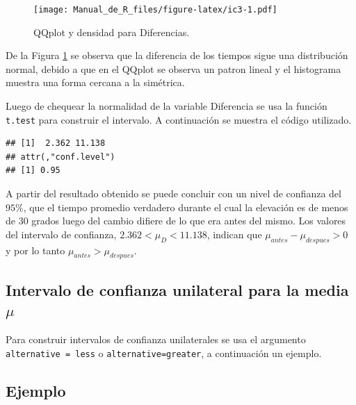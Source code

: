 \documentclass[10pt,]{krantz}
\makeatletter
\newenvironment{Shaded}{\begin{snugshade}}{\end{snugshade}}
\newcommand{\KeywordTok}[1]{\textcolor[rgb]{0.13,0.29,0.53}{\textbf{{#1}}}}
\newcommand{\DataTypeTok}[1]{\textcolor[rgb]{0.13,0.29,0.53}{{#1}}}
\newcommand{\FloatTok}[1]{\textcolor[rgb]{0.00,0.00,0.81}{{#1}}}
\newcommand{\OtherTok}[1]{\textcolor[rgb]{0.56,0.35,0.01}{{#1}}}
\newcommand{\NormalTok}[1]{{#1}}
\newenvironment{kframe}{%
\medskip{}
\setlength{\fboxsep}{.8em}
 \def\at@end@of@kframe{}%
 \ifinner\ifhmode%
  \def\at@end@of@kframe{\end{minipage}}%
  \begin{minipage}{\columnwidth}%
 \fi\fi%
 \def\FrameCommand##1{\hskip\@totalleftmargin \hskip-\fboxsep
 \colorbox{shadecolor}{##1}\hskip-\fboxsep
     \hskip-\linewidth \hskip-\@totalleftmargin \hskip\columnwidth}%
 \MakeFramed {\advance\hsize-\width
   \@totalleftmargin\z@ \linewidth\hsize
   \@setminipage}}%
 {\par\unskip\endMakeFramed%
 \at@end@of@kframe}
\renewenvironment{Shaded}{\begin{kframe}}{\end{kframe}}
\makeatother
\begin{document}
\begin{figure}[htbp]
\centering
\texttt{[image: Manual\_de\_R\_files/figure-latex/ic3-1.pdf]}
\caption{\label{fig:ic3}QQplot y densidad para Diferencias.}
\end{figure}

De la Figura \ref{fig:ic3} se observa que la diferencia de los tiempos
sigue una distribución normal, debido a que en el QQplot se observa un
patron lineal y el histograma muestra una forma cercana a la simétrica.

Luego de chequear la normalidad de la variable Diferencia se usa la
función \texttt{t.test} para construir el intervalo. A continuación se
muestra el código utilizado.

\begin{Shaded}
\end{Shaded}

\begin{verbatim}
## [1]  2.362 11.138
## attr(,"conf.level")
## [1] 0.95
\end{verbatim}

A partir del resultado obtenido se puede concluir con un nivel de
confianza del \(95\%\), que el tiempo promedio verdadero durante el cual
la elevación es de menos de 30 grados luego del cambio difiere de lo que
era antes del mismo. Los valores del intervalo de confianza,
\(2.362< \mu_D < 11.138\), indican que \(\mu_{antes} - \mu_{despues}>0\)
y por lo tanto \(\mu_{antes} > \mu_{despues}\).

\subsection{\texorpdfstring{Intervalo de confianza unilateral para la
media
\(\mu\)}{Intervalo de confianza unilateral para la media \textbackslash{}mu}}\label{intervalo-de-confianza-unilateral-para-la-media-mu}

Para construir intervalos de confianza unilaterales se usa el argumento
\texttt{alternative\ =\ \textquotesingle{}less\textquotesingle{}} o
\texttt{alternative=\textquotesingle{}greater\textquotesingle{}}, a
continuación un ejemplo.

\subsection*{Ejemplo}\label{ejemplo-56}
\end{document}
